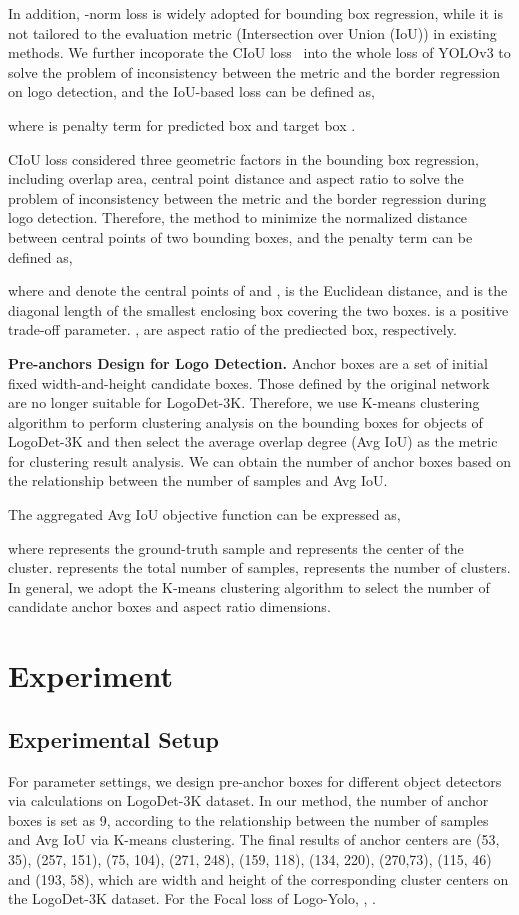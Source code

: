 \documentclass[journal]{IEEEtran}
\begin{document}
In addition, -norm loss is widely adopted for bounding box regression, while it is not tailored to the evaluation metric (Intersection over Union (IoU)) in existing methods. We further incoporate the CIoU loss~\cite{Zheng2020Distance} into the whole loss of YOLOv3 to solve the problem of inconsistency between the metric and the border regression on logo detection, and the IoU-based loss can be defined as,

where  is penalty term for predicted box  and target box .  

CIoU loss considered three geometric factors in the bounding box regression, including overlap area, central point distance and aspect ratio to solve the problem of inconsistency between the metric and the border regression during logo detection. Therefore, the method to minimize the normalized distance between central points of two bounding boxes, and the penalty term can be defined as,

where  and  denote the central points of  and ,  is the Euclidean distance, and  is the diagonal length of the smallest enclosing box covering the two boxes.  is a positive trade-off parameter. ,  are aspect ratio of the prediected box, respectively.

\textbf{Pre-anchors Design for Logo Detection.} Anchor boxes are a set of initial fixed width-and-height candidate boxes. Those defined by the original network are no longer suitable for LogoDet-3K. Therefore, we use K-means clustering algorithm to perform clustering analysis on the bounding boxes for objects of LogoDet-3K and then select the average overlap degree (Avg IoU) as the metric for clustering result analysis.  We can obtain the number of anchor boxes based on the relationship between the number of samples and Avg IoU.

The aggregated Avg IoU objective function  can be expressed as,

where  represents the ground-truth sample and  represents the center of the cluster.  represents the total number of samples,  represents the number of clusters. In general, we adopt the K-means clustering algorithm to select the number of candidate anchor boxes and aspect ratio dimensions. 



\section{Experiment}
\subsection{Experimental Setup}
For parameter settings, we design pre-anchor boxes for different object detectors via calculations on LogoDet-3K dataset. In our method, the number of anchor boxes is set as 9, according to the relationship between the number of samples and Avg IoU via K-means clustering. The final results of anchor centers are (53, 35), (257, 151), (75, 104), (271, 248), (159, 118), (134, 220), (270,73), (115, 46) and (193, 58), which are width and height of the corresponding cluster centers on the LogoDet-3K dataset. For the Focal loss of Logo-Yolo, , . 
\end{document}
